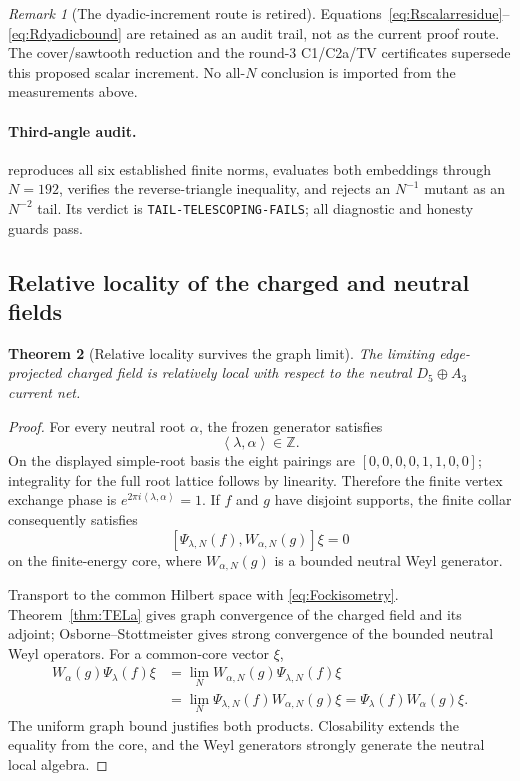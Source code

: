 \documentclass[11pt]{article}
\newtheorem{theorem}{Theorem}[section]
\theoremstyle{remark}
\newtheorem{remark}[theorem]{Remark}
\newcommand{\Z}{\mathbb Z}
\newcommand{\ip}[2]{\left\langle#1,#2\right\rangle}
\begin{document}
\begin{remark}[The dyadic-increment route is retired]
Equations~\eqref{eq:Rscalarresidue}--\eqref{eq:Rdyadicbound} are retained as
an audit trail, not as the current proof route.  The cover/sawtooth reduction
and the round-3 C1/C2a/TV certificates supersede this proposed scalar
increment.  No all-$N$ conclusion is imported from the measurements above.
\end{remark}

\paragraph{Third-angle audit.}
 reproduces all
six established finite norms, evaluates both embeddings through
$N=192$, verifies the reverse-triangle inequality, and rejects an
$N^{-1}$ mutant as an $N^{-2}$ tail.  Its verdict is
\texttt{TAIL-TELESCOPING-FAILS}; all diagnostic and honesty guards pass.

\subsection{Relative locality of the charged and neutral fields}

\begin{theorem}[Relative locality survives the graph limit]
\label{thm:relativeLocality}
The limiting edge-projected charged field is relatively local with
respect to the neutral $D_5\oplus A_3$ current net.
\end{theorem}

\begin{proof}
For every neutral root $\alpha$, the frozen generator satisfies
\[
 \ip{\lambda}{\alpha}\in\Z.
\tag{5.26}\label{eq:integralpairing}
\]
On the displayed simple-root basis the eight pairings are
$[0,0,0,0,1,1,0,0]$; integrality for the full root lattice follows by
linearity.  Therefore the finite vertex exchange phase is
$e^{2\pi i\ip{\lambda}{\alpha}}=1$.  If $f$ and $g$ have disjoint
supports, the finite collar consequently satisfies
\[
 [\Psi_{\lambda,N}(f),W_{\alpha,N}(g)]\xi=0
\]
on the finite-energy core, where $W_{\alpha,N}(g)$ is a bounded neutral
Weyl generator.

Transport to the common Hilbert space with \eqref{eq:Fockisometry}.
Theorem~\ref{thm:TELa} gives graph convergence of the charged field and
its adjoint; Osborne--Stottmeister gives strong convergence of the
bounded neutral Weyl operators.  For a common-core vector $\xi$,
\[
\begin{aligned}
 W_\alpha(g)\Psi_\lambda(f)\xi
 &=\lim_NW_{\alpha,N}(g)\Psi_{\lambda,N}(f)\xi\\
 &=\lim_N\Psi_{\lambda,N}(f)W_{\alpha,N}(g)\xi
 =\Psi_\lambda(f)W_\alpha(g)\xi .
\end{aligned}
\]
The uniform graph bound justifies both products.  Closability extends
the equality from the core, and the Weyl generators strongly generate
the neutral local algebra.
\end{proof}
\end{document}
